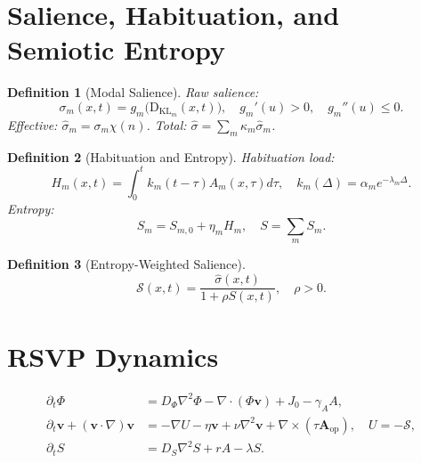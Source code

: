 \documentclass[openany]{book}
\newtheorem{definition}{Definition}[chapter]
\newcommand{\PhiS}{\Phi} %
\newcommand{\vvec}{\mathbf{v}} %
\newcommand{\Sent}{S} %
\newcommand{\KL}{\mathrm{D}_{\mathrm{KL}}}
\begin{document}
{{\section{Salience, Habituation, and Semiotic Entropy}
\label{sec:rsvp-salience}
\begin{definition}[Modal Salience]
\label{def:salience}
Raw salience:
\begin{equation}
\label{eq:raw-salience}
\sigma_{m}(x,t) = g_m\big(\KL_{m}(x,t)\big), \quad g_m'(u) > 0, \quad g_m''(u) \leq 0.
\end{equation}
Effective: \(\widehat{\sigma}_{m} = \sigma_{m} \chi(n)\). Total: \(\widehat{\sigma} = \sum_m \kappa_m \widehat{\sigma}_{m}\).
\end{definition}

\begin{definition}[Habituation and Entropy]
\label{def:habituation}
Habituation load:
\begin{equation}
\label{eq:habituation}
H_m(x,t) = \int_{0}^{t} k_m(t-\tau) A_m(x,\tau) d\tau, \quad k_m(\Delta) = \alpha_m e^{-\lambda_m \Delta}.
\end{equation}
Entropy:
\begin{equation}
\label{eq:semiotic-entropy}
\Sent_m = S_{m,0} + \eta_m H_m, \quad \Sent = \sum_m \Sent_m.
\end{equation}
\end{definition}

\begin{definition}[Entropy-Weighted Salience]
\label{def:entropy-weighted-salience}
\begin{equation}
\label{eq:entropy-suppress}
\mathcal{S}(x,t) = \frac{\widehat{\sigma}(x,t)}{1 + \rho \Sent(x,t)}, \quad \rho > 0.
\end{equation}
\end{definition}

\section{RSVP Dynamics}
\label{sec:rsvp-dynamics}
\begin{align}
\partial_t \PhiS &= D_\Phi \nabla^2 \PhiS - \nabla \cdot (\PhiS \vvec) + J_0 - \gamma_A A, \label{eq:phi} \\
\partial_t \vvec + (\vvec \cdot \nabla)\vvec &= -\nabla U - \eta \vvec + \nu \nabla^2 \vvec + \nabla \times (\tau \mathbf{A}_{\mathrm{op}}), \quad U=-\mathcal{S}, \label{eq:v} \\
\partial_t \Sent &= D_S \nabla^2 \Sent + r A - \lambda \Sent. \label{eq:S}
\end{align}

}}
\end{document}
